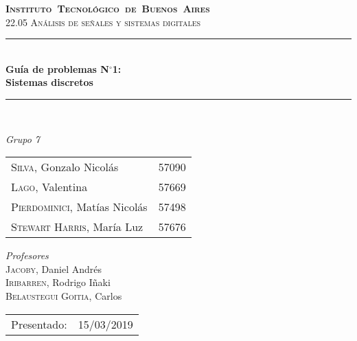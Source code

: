 \begin{titlepage}
\newcommand{\HRule}{\rule{\linewidth}{0.5mm}}
\center
\mbox{\textsc{\LARGE \bfseries {Instituto Tecnol\'ogico de Buenos Aires}}}\\[1.5cm]
\textsc{\Large 22.05 An\'alisis de señales y sistemas digitales}\\[0.5cm]


\HRule \\[0.6cm]
{ \Huge \bfseries Gu\'ia de problemas N$^\circ$1: \\ Sistemas discretos}\\[0.4cm] %
\HRule \\[1.5cm]


{\large

\emph{Grupo 7}\\
\vspace{3px}

\begin{tabular}{lr} 	
\textsc{Silva}, Gonzalo Nicol\'as & 57090 \\
\textsc{Lago}, Valentina & 57669 \\ 	
\textsc{Pierdominici}, Mat\'ias Nicol\'as & 57498 \\
\textsc{Stewart Harris}, Mar\'ia Luz  & 57676 \\ 	     
\end{tabular}

\vspace{20px}

\emph{Profesores}\\
\vspace{3px}
\textsc{Jacoby,} Daniel Andr\'es\\ 	
\textsc{Iribarren,} Rodrigo I\~naki\\
\textsc{Belaustegui Goitia,} Carlos \\

\vspace{100px}

\begin{tabular}{ll}

Presentado: & 15/03/2019\\

\end{tabular}

}

\vfill

\end{titlepage}